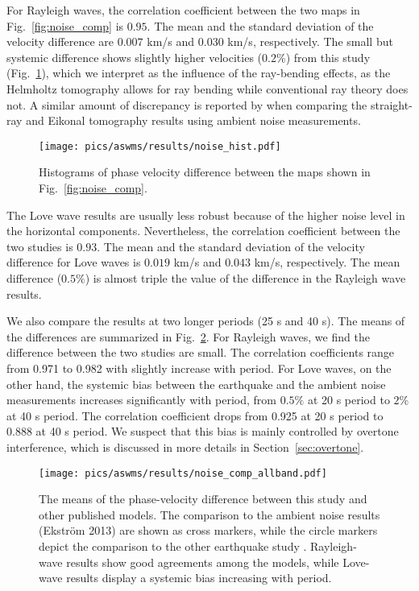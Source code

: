 For Rayleigh waves, the correlation coefficient between the two maps in Fig.~\ref{fig:noise_comp} is $0.95$. The mean and the standard deviation of the velocity difference are $0.007$ km/s and $0.030$ km/s, respectively. 
The small but systemic difference shows slightly higher velocities ($0.2\%$) from this study (Fig.~\ref{fig:noise_hist}), which we interpret as the influence of the ray-bending effects, as the Helmholtz tomography allows for ray bending while conventional ray theory does not. A similar amount of discrepancy is reported by \citet{Lin:2009fx} when comparing the straight-ray and Eikonal tomography results using ambient noise measurements.

\begin{figure}
\center
	\texttt{[image: pics/aswms/results/noise\_hist.pdf]}
	\caption{Histograms of phase velocity difference between the maps shown in Fig.~\ref{fig:noise_comp}.}
	\label{fig:noise_hist}
\end{figure}

The Love wave results are usually less robust because of the higher noise level in the horizontal components. Nevertheless, the correlation coefficient between the two studies is $0.93$. The mean and the standard deviation of the velocity difference for Love waves is $0.019$ km/s and $0.043$ km/s, respectively. The mean difference ($0.5\%$) is almost triple the value of the difference in the Rayleigh wave results. 

We also compare the results at two longer periods (25 s and 40 s). The means of the differences are summarized in Fig.~\ref{fig:noise_comp_allband}. For Rayleigh waves, we find the difference between the two studies are small. The correlation coefficients range from 0.971 to 0.982 with slightly increase with period. For Love waves, on the other hand, the systemic bias between the earthquake and the ambient noise measurements increases significantly with period, from $0.5 \%$ at 20 s period to $2 \%$ at 40 s period. The correlation coefficient drops from 0.925 at 20 s period to 0.888 at 40 s period. We suspect that this bias is mainly controlled by overtone interference, which is discussed in more details in Section~\ref{sec:overtone}.

\begin{figure}
	\center
	\texttt{[image: pics/aswms/results/noise\_comp\_allband.pdf]}
	\caption[The means of the phase-velocity difference between this study and other published models.]{The means of the phase-velocity difference between this study and other published models. The comparison to the ambient noise results (Ekstr\"{o}m 2013) are shown as cross markers, while the circle markers depict the comparison to the other earthquake study \citep{foster:2014kna}. Rayleigh-wave results show good agreements among the models, while Love-wave results display a systemic bias increasing with period.}
	\label{fig:noise_comp_allband}
\end{figure}

